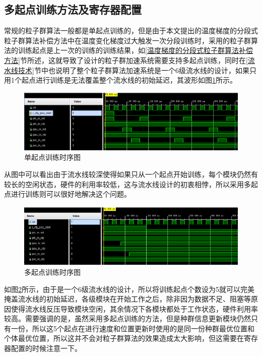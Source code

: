 \subsection{多起点训练方法及寄存器配置}
常规的粒子群算法一般都是单起点训练的，但是由于本文提出的温度梯度的分段式粒子群算法补偿方法中在温度变化梯度过大触发一次分段训练时，采用的粒子群算法的训练起点是上一次的训练的训练结果，如\ref{温度梯度的分段式粒子群算法补偿方法}节所述，这就导致了设计的粒子群加速系统需要支持多起点训练，同时在\ref{流水线技术}节中也说明了整个粒子群算法加速系统是一个6级流水线的设计，如果只用1个起点进行训练是无法覆盖整个流水线的初始延迟，其波形如图\ref{fig:单起点训练时序图}所示。
\begin{figure}[htb]
    \centering
    \includegraphics[width=14cm]{fig/5-fig/单起点训练时序图.jpg}
    \caption{单起点训练时序图}
    \label{fig:单起点训练时序图}
\end{figure}

从图中可以看出由于流水线较深使得如果只从一个起点开始训练，每个模块仍然有较长的空闲状态，硬件的利用率较低，这与流水线设计的初衷相悖，所以采用多起点进行训练则可以很好地解决这个问题。
\begin{figure}[htb]
    \centering
    \includegraphics[width=14cm]{fig/5-fig/多起点训练时序图.jpg}
    \caption{多起点训练时序图}
    \label{fig:多起点训练时序图}
\end{figure}

如图\ref{fig:多起点训练时序图}所示，由于是一个6级流水线的设计，所以将训练起点个数设为5就可以完美掩盖流水线的初始延迟，各级模块在开始工作之后，除非因为数据不足、阻塞等原因使得流水线反压导致模块空闲，其余情况下各模块都处于工作状态，硬件利用率较高。需要强调的是，虽然采用多起点训练的方法，但是种群信息更新模块仍然只有一份，所以这5个起点在进行速度和位置更新时使用的是同一份种群最优位置和个体最优位置，所以这并不会对粒子群算法的效果造成太大影响，但这需要在寄存器配置的时候注意一下。

